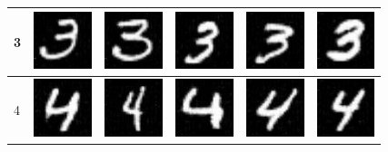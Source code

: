 \begin{table}[ht]
\begin{tabular}{|llllll|}
3 & \includegraphics[width=1.69cm, height=1.69cm]{Files/MNIST/0-3.png}  &\includegraphics[width=1.69cm, height=1.69cm]{Files/MNIST/1-5.png}   & \includegraphics[width=1.69cm, height=1.69cm]{Files/MNIST/2-7.png}  & \includegraphics[width=1.69cm, height=1.69cm]{Files/MNIST/5-3.png}  & \includegraphics[width=1.69cm, height=1.69cm]{Files/MNIST/6-5.png} \\ \hline

4 & \includegraphics[width=1.69cm, height=1.69cm]{Files/MNIST/0-4.png}  &\includegraphics[width=1.69cm, height=1.69cm]{Files/MNIST/1-6.png}   & \includegraphics[width=1.69cm, height=1.69cm]{Files/MNIST/3-0.png}  & \includegraphics[width=1.69cm, height=1.69cm]{Files/MNIST/5-4.png}  & \includegraphics[width=1.69cm, height=1.69cm]{Files/MNIST/6-6.png} \\ \hline


\end{tabular}
\end{table}
